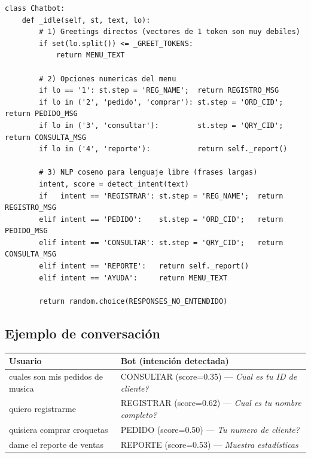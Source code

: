 \documentclass[12pt,a4paper]{article}
\begin{document}
\begin{lstlisting}[style=python, caption={chatbot.py --- maquina de estados + NLP}]
class Chatbot:
    def _idle(self, st, text, lo):
        # 1) Greetings directos (vectores de 1 token son muy debiles)
        if set(lo.split()) <= _GREET_TOKENS:
            return MENU_TEXT

        # 2) Opciones numericas del menu
        if lo == '1': st.step = 'REG_NAME';  return REGISTRO_MSG
        if lo in ('2', 'pedido', 'comprar'): st.step = 'ORD_CID'; return PEDIDO_MSG
        if lo in ('3', 'consultar'):         st.step = 'QRY_CID'; return CONSULTA_MSG
        if lo in ('4', 'reporte'):           return self._report()

        # 3) NLP coseno para lenguaje libre (frases largas)
        intent, score = detect_intent(text)
        if   intent == 'REGISTRAR': st.step = 'REG_NAME';  return REGISTRO_MSG
        elif intent == 'PEDIDO':    st.step = 'ORD_CID';   return PEDIDO_MSG
        elif intent == 'CONSULTAR': st.step = 'QRY_CID';   return CONSULTA_MSG
        elif intent == 'REPORTE':   return self._report()
        elif intent == 'AYUDA':     return MENU_TEXT

        return random.choice(RESPONSES_NO_ENTENDIDO)
\end{lstlisting}

\subsection{Ejemplo de conversación}

\begin{center}
\small
\begin{tabular}{p{5.2cm} p{7.4cm}}
\toprule
\textbf{Usuario} & \textbf{Bot (intención detectada)} \\
\midrule
cuales son mis pedidos de musica &
  CONSULTAR (score=0.35) --- \textit{Cual es tu ID de cliente?} \\[4pt]
quiero registrarme &
  REGISTRAR (score=0.62) --- \textit{Cual es tu nombre completo?} \\[4pt]
quisiera comprar croquetas &
  PEDIDO (score=0.50) --- \textit{Tu numero de cliente?} \\[4pt]
dame el reporte de ventas &
  REPORTE (score=0.53) --- \textit{Muestra estadísticas} \\
\bottomrule
\end{tabular}
\end{center}

\end{document}
